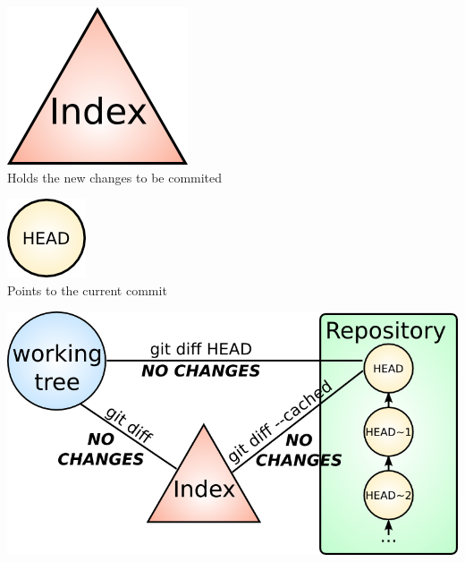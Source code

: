 \begin{frame}

  \begin{center}
    \includegraphics[width=.25\textwidth]{images/git-index.png}\\\vspacing
    \Large{Holds the new changes to be commited}
  \end{center}
\end{frame}


\begin{frame}

  \begin{center}
    \includegraphics[width=.25\textwidth]{images/git-head.png}\\\vspacing
    \Large{Points to the current commit}
  \end{center}
\end{frame}


\begin{frame}[plain]

  \begin{center}
    \includegraphics[width=1.0\textwidth]{images/git-diffs.png}
  \end{center}
\end{frame}

